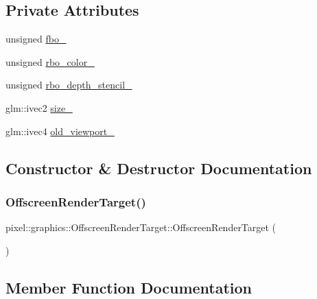 \subsection*{Private Attributes}
\begin{DoxyCompactItemize}
\item 
unsigned \hyperlink{classpixel_1_1graphics_1_1_offscreen_render_target_ab040cfa6c283593124e05bf2e668176a}{fbo\+\_\+}
\item 
unsigned \hyperlink{classpixel_1_1graphics_1_1_offscreen_render_target_a4ad6892135a7e4f68953944c287c2645}{rbo\+\_\+color\+\_\+}
\item 
unsigned \hyperlink{classpixel_1_1graphics_1_1_offscreen_render_target_a862be1d24be8b6a08132e36796d46085}{rbo\+\_\+depth\+\_\+stencil\+\_\+}
\item 
glm\+::ivec2 \hyperlink{classpixel_1_1graphics_1_1_offscreen_render_target_a583e64f23f20f404fd3f845e2d0e207d}{size\+\_\+}
\item 
glm\+::ivec4 \hyperlink{classpixel_1_1graphics_1_1_offscreen_render_target_a47407823935b91e47783db5a381691c4}{old\+\_\+viewport\+\_\+}
\end{DoxyCompactItemize}


\subsection{Constructor \& Destructor Documentation}
\mbox{\label{classpixel_1_1graphics_1_1_offscreen_render_target_a09267c820dd5d349a0a455f8d38d442a}} 
\subsubsection{\texorpdfstring{Offscreen\+Render\+Target()}{OffscreenRenderTarget()}}
{\footnotesize\ttfamily pixel\+::graphics\+::\+Offscreen\+Render\+Target\+::\+Offscreen\+Render\+Target (\begin{DoxyParamCaption}{ }\end{DoxyParamCaption})}



\subsection{Member Function Documentation}
\mbox{\label{classpixel_1_1graphics_1_1_offscreen_render_target_a1ef8c7558df5d0defc1dd7083641d436}} 
